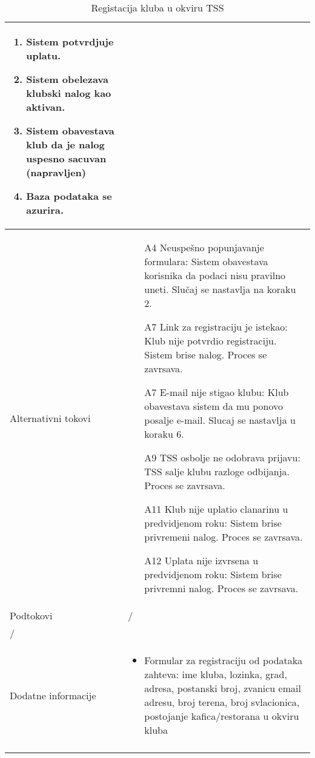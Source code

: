 \documentclass{article}
\begin{document}
\begin{longtable}{| p{} | p{} |}
\begin{enumerate}
        \item Sistem potvrdjuje uplatu.
        \item Sistem obelezava klubski nalog kao aktivan.
        \item Sistem obavestava klub da je nalog uspesno sacuvan (napravljen)
        \item Baza podataka se azurira.
    \end{enumerate}\\
\hline
    Alternativni tokovi & \begin{itemize}
        \item[A4] Neuspešno popunjavanje formulara: Sistem obavestava korisnika da podaci nisu pravilno uneti. Slučaj se nastavlja na koraku 2.
        \item[A7] Link za registraciju je istekao: Klub nije potvrdio registraciju. Sistem brise nalog. Proces se zavrsava.
        \item[A7] E-mail nije stigao klubu: Klub obavestava sistem da mu ponovo posalje e-mail. Slucaj se nastavlja u koraku 6.
        \item[A9] TSS osbolje ne odobrava prijavu: TSS salje klubu razloge odbijanja. Proces se zavrsava.
        \item[A11] Klub nije uplatio clanarinu u predvidjenom roku: Sistem brise privremeni nalog. Proces se zavrsava.
        \item[A12] Uplata nije izvrsena u predvidjenom roku: Sistem brise privremni nalog. Proces se zavrsava.
    \end{itemize}\\
\hline
    Podtokovi & /\\
\hline
    /\\
\hline
    Dodatne informacije & \begin{itemize}
        \item Formular za registraciju od podataka zahteva: ime kluba, lozinka, grad, adresa, postanski broj, zvanicu email adresu, broj terena, broj svlacionica, postojanje kafica/restorana u okviru kluba
    \end{itemize} \\
\hline
\caption{Registacija kluba u okviru TSS} %
\end{longtable}


\end{document}
